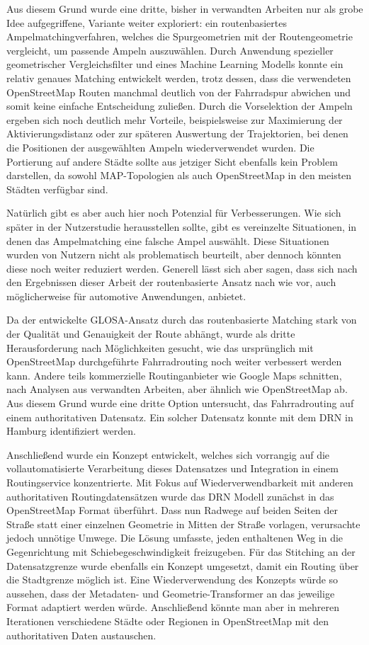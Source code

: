 Aus diesem Grund wurde eine dritte, bisher in verwandten Arbeiten nur als grobe Idee aufgegriffene, Variante weiter exploriert: ein routenbasiertes Ampelmatchingverfahren, welches die Spurgeometrien mit der Routengeometrie vergleicht, um passende Ampeln auszuwählen. Durch Anwendung spezieller geometrischer Vergleichsfilter und eines Machine Learning Modells konnte ein relativ genaues Matching entwickelt werden, trotz dessen, dass die verwendeten OpenStreetMap Routen manchmal deutlich von der Fahrradspur abwichen und somit keine einfache Entscheidung zuließen. Durch die Vorselektion der Ampeln ergeben sich noch deutlich mehr Vorteile, beispielsweise zur Maximierung der Aktivierungsdistanz oder zur späteren Auswertung der Trajektorien, bei denen die Positionen der ausgewählten Ampeln wiederverwendet wurden. Die Portierung auf andere Städte sollte aus jetziger Sicht ebenfalls kein Problem darstellen, da sowohl MAP-Topologien als auch OpenStreetMap in den meisten Städten verfügbar sind. 

Natürlich gibt es aber auch hier noch Potenzial für Verbesserungen. Wie sich später in der Nutzerstudie herausstellen sollte, gibt es vereinzelte Situationen, in denen das Ampelmatching eine falsche Ampel auswählt. Diese Situationen wurden von Nutzern nicht als problematisch beurteilt, aber dennoch könnten diese noch weiter reduziert werden. Generell lässt sich aber sagen, dass sich nach den Ergebnissen dieser Arbeit der routenbasierte Ansatz nach wie vor, auch möglicherweise für automotive Anwendungen, anbietet.

Da der entwickelte GLOSA-Ansatz durch das routenbasierte Matching stark von der Qualität und Genauigkeit der Route abhängt, wurde als dritte Herausforderung nach Möglichkeiten gesucht, wie das ursprünglich mit OpenStreetMap durchgeführte Fahrradrouting noch weiter verbessert werden kann. Andere teils kommerzielle Routinganbieter wie Google Maps schnitten, nach Analysen aus verwandten Arbeiten, aber ähnlich wie OpenStreetMap ab. Aus diesem Grund wurde eine dritte Option untersucht, das Fahrradrouting auf einem authoritativen Datensatz. Ein solcher Datensatz konnte mit dem DRN in Hamburg identifiziert werden. 

Anschließend wurde ein Konzept entwickelt, welches sich vorrangig auf die vollautomatisierte Verarbeitung dieses Datensatzes und Integration in einem Routingservice konzentrierte. Mit Fokus auf Wiederverwendbarkeit mit anderen authoritativen Routingdatensätzen wurde das DRN Modell zunächst in das OpenStreetMap Format überführt. Dass nun Radwege auf beiden Seiten der Straße statt einer einzelnen Geometrie in Mitten der Straße vorlagen, verursachte jedoch unnötige Umwege. Die Lösung umfasste, jeden enthaltenen Weg in die Gegenrichtung mit Schiebegeschwindigkeit freizugeben. Für das Stitching an der Datensatzgrenze wurde ebenfalls ein Konzept umgesetzt, damit ein Routing über die Stadtgrenze möglich ist. Eine Wiederverwendung des Konzepts würde so aussehen, dass der Metadaten- und Geometrie-Transformer an das jeweilige Format adaptiert werden würde. Anschließend könnte man aber in mehreren Iterationen verschiedene Städte oder Regionen in OpenStreetMap mit den authoritativen Daten austauschen.

